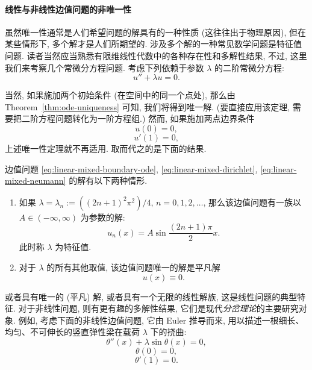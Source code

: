 \paragraph*{线性与非线性边值问题的非唯一性}

虽然唯一性通常是人们希望问题的解具有的一种性质 (这往往出于物理原因), 但在某些情形下, 多个解才是人们所期望的. 涉及多个解的一种常见数学问题是特征值问题. 读者当然应当熟悉有限维线性代数中的各种存在性和多解性结果, 不过, 这里我们来考察几个常微分方程问题. 考虑下列依赖于参数 $\lambda$ 的二阶常微分方程:
\begin{equation}\label{eq:linear-mixed-boundary-ode}
u''+\lambda u=0.
\end{equation}

当然, 如果施加两个初始条件 (在空间中的同一个点处), 那么由 Theorem~\ref{thm:ode-uniqueness} 可知, 我们将得到唯一解. (要直接应用该定理, 需要把二阶方程问题转化为一阶方程组.) 然而, 如果施加两点边界条件
\begin{equation}\label{eq:linear-mixed-dirichlet}
u(0)=0,
\end{equation}
\begin{equation}\label{eq:linear-mixed-neumann}
u'(1)=0,
\end{equation}
上述唯一性定理就不再适用. 取而代之的是下面的结果.

\begin{Theorem}
\label{thm:linear-mixed-boundary-alternatives}
边值问题 \eqref{eq:linear-mixed-boundary-ode}, \eqref{eq:linear-mixed-dirichlet}, \eqref{eq:linear-mixed-neumann} 的解有以下两种情形.
\begin{enumerate}
\item 如果 $\lambda=\lambda_n:=((2n+1)^2\pi^2)/4$, $n=0,1,2,\ldots$, 那么该边值问题有一族以 $A\in(-\infty,\infty)$ 为参数的解:
\[
u_n(x)=A\sin\dfrac{(2n+1)\pi}{2}x.
\]
此时称 $\lambda$ 为特征值.
\item 对于 $\lambda$ 的所有其他取值, 该边值问题唯一的解是平凡解
\[
u(x)\equiv0.
\]
\end{enumerate}
\end{Theorem}

或者具有唯一的 (平凡) 解, 或者具有一个无限的线性解族, 这是线性问题的典型特征. 对于非线性问题, 则有更有趣的多解性结果, 它们是现代\emph{分岔理论}的主要研究对象. 例如, 考虑下面的非线性边值问题, 它由 Euler 推导而来, 用以描述一根细长、均匀、不可伸长的竖直弹性梁在载荷 $\lambda$ 下的挠曲:
\begin{equation}\label{eq:euler-elastica}
\theta''(x)+\lambda\sin\theta(x)=0,
\end{equation}
\begin{equation}\label{eq:euler-elastica-dirichlet}
\theta(0)=0,
\end{equation}
\begin{equation}\label{eq:euler-elastica-neumann}
\theta'(1)=0.
\end{equation}

